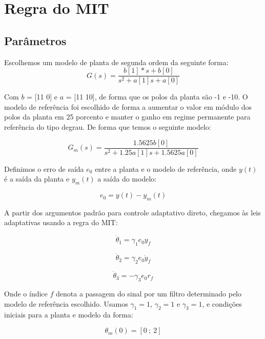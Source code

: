 
\chapter{Regra do MIT}
\section{Parâmetros}
Escolhemos um modelo de planta de segunda ordem da seguinte forma:
\begin{equation}
G(s) = \frac{b[1]*s + b[0]}{s^2 + a[1]s + a[0]}
\end{equation}

Com $b$ = [11 0] e $a$ = [11 10], de forma que os polos da planta são -1 e -10. O modelo de referência foi escolhido de forma a aumentar o valor em módulo dos polos da planta em 25 porcento e manter o ganho em regime permanente para referência do tipo degrau. De forma que temos o seguinte modelo:

\begin{equation}
G_m(s) = \frac{1.5625b[0]}{s^2 + 1.25a[1]s + 1.5625a[0]}
\end{equation} 

Definimos o erro de saída $e_0$ entre a planta e o modelo de referência, onde $y(t)$ é a saída da planta e $y_m(t)$ a saída do modelo:

\begin{equation}
e_0 = y(t) - y_m(t)
\end{equation}

A partir dos argumentos padrão para controle adaptativo direto, chegamos às leis adaptativas usando a regra do MIT:

\begin{equation}
\dot{\theta}_1 = \gamma_1 e_0 y_f
\end{equation}

\begin{equation}
\dot{\theta}_2 = \gamma_2 e_0 \dot{y}_f
\end{equation}

\begin{equation}
\dot{\theta}_3 = -\gamma_3 e_0 r_f
\end{equation}

Onde o índice $f$ denota a passagem do sinal por um filtro determinado pelo modelo de referência escolhido. Usamos $\gamma_1 = 1$, $\gamma_2=1$ e $\gamma_3=1$, e condições iniciais para a planta e modelo da forma:

\begin{equation}
\theta_m(0) = [0~;~2]
\end{equation}

